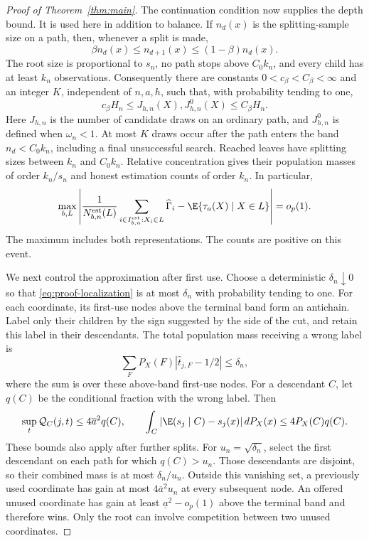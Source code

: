 \begin{appendix}
\begin{proof}[Proof of Theorem~\ref{thm:main}]
The continuation condition now supplies the depth bound. It is used here
in addition to balance. If \(n_d(x)\) is the splitting-sample size on a path,
then, whenever a split is made,
\[
\beta n_d(x)\le n_{d+1}(x)\le(1-\beta)n_d(x).
\]
The root size is proportional to \(s_n\), no path stops above \(C_0k_n\),
and every child has at least \(k_n\) observations. Consequently there are
constants \(0<c_\beta<C_\beta<\infty\) and an integer \(K\), independent of
\(n,a,h\), such that, with probability tending to one,
\begin{equation}\label{eq:proof-depth}
c_\beta H_n\le J_{h,n}(X),J_{h,n}^0(X)\le C_\beta H_n.
\end{equation}
Here \(J_{h,n}\) is the number of candidate draws on an ordinary path,
and \(J_{h,n}^0\) is defined when \(\omega_n<1\).
At most \(K\) draws occur after the path enters the band
\(n_d<C_0k_n\), including a final unsuccessful search. Reached leaves have
splitting sizes between \(k_n\) and \(C_0k_n\). Relative concentration gives
their population masses of order \(k_n/s_n\) and honest estimation counts
of order \(k_n\). In particular,
\begin{equation}\label{eq:proof-leaf}
\max_{b,L}\left|
\frac{1}{N_{b,n}^{\rm est}(L)}
\sum_{i\in I_{b,n}^{\rm est}:X_i\in L}\widehat\Gamma_i
-\E\{\tau_a(X)\mid X\in L\}
\right|=o_p(1).
\end{equation}
The maximum includes both representations. The counts are positive on this
event.

We next control the approximation after first use. Choose a deterministic
\(\delta_n\downarrow0\) so that \eqref{eq:proof-localization} is at most
\(\delta_n\) with probability tending to one. For each coordinate, its
first-use nodes above the terminal band form an antichain. Label only their
children by the sign suggested by the side of the cut, and retain this label
in their descendants. The total population mass receiving a wrong label is
\[
\sum_F P_X(F)|\widehat t_{j,F}-1/2|\le\delta_n,
\]
where the sum is over these above-band first-use nodes.
For a descendant \(C\), let \(q(C)\) be the conditional fraction with the
wrong label. Then
\[
\sup_t\mathcal Q_C(j,t)\le4\overline a^2q(C),
\qquad
\int_C|\E(s_j\mid C)-s_j(x)|\,dP_X(x)\le4P_X(C)q(C).
\]
These bounds also apply after further splits. For
\(u_n=\sqrt{\delta_n}\), select the first descendant on each path for which
\(q(C)>u_n\). Those descendants are disjoint, so their combined mass is at
most \(\delta_n/u_n\). Outside this vanishing set, a previously used
coordinate has gain at most \(4\overline a^2u_n\) at every subsequent node.
An offered unused coordinate has gain at least
\(\underline a^2-o_p(1)\) above the terminal band and therefore wins.
Only the root can involve competition between two unused coordinates.


\end{proof}
\end{appendix}
